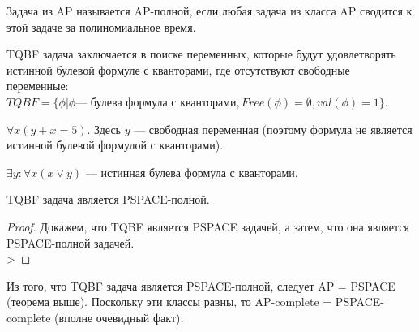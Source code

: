     \begin{Def}
        Задача из AP называется AP-полной, если любая задача из класса AP сводится к этой задаче за полиномиальное время.
    \end{Def}
    \begin{Def}
        TQBF задача заключается в поиске переменных, которые будут удовлетворять истинной булевой формуле с кванторами, где отсутствуют свободные переменные: $TQBF = \{\phi | \phi  \text{--- булева формула с кванторами}, Free(\phi) = \emptyset, val(\phi) = 1\}$.
    \end{Def}
    \begin{Example}
        $\forall x (y + x = 5)$. Здесь $y$ --- свободная переменная (поэтому формула не является истинной булевой формулой с кванторами).
    \end{Example}
    \begin{Example}
        $\exists y : \forall x (x \vee y)$ --- истинная булева формула с кванторами.
    \end{Example}
    \begin{Thm}
        TQBF задача является PSPACE-полной.
    \end{Thm}
    \begin{proof}
        Докажем, что TQBF является PSPACE задачей, а затем, что она является PSPACE-полной задачей.\\
        > 
    \end{proof}
    \begin{Rem}
        Из того, что TQBF задача является PSPACE-полной, следует AP = PSPACE (теорема выше). Поскольку эти классы равны, то AP-complete = PSPACE-complete (вполне очевидный факт).
    \end{Rem}
